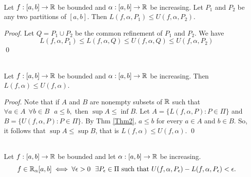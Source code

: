 \begin{theorem} \leavevmode \\
    \label{Thm2}
    Let $f: [a,b] \to \mathbb{R}$ be bounded and $\alpha : [a,b] \to \mathbb{R}$ be increasing. Let $P_1$ and $P_2$ be any two partitions of $[a,b].$ Then $L(f, \alpha, P_1) \leq U(f, \alpha, P_2)$.
\end{theorem}

\begin{proof}
    Let $Q = P_1 \cup P_2$ be the common refinement of $P_1$ and $P_2$. We have 
    $$
        L(f, \alpha, P_1) \leq L(f, \alpha, Q) \leq U(f, \alpha, Q) \leq U(f, \alpha, P_2)
    $$
    \qed
\end{proof}

\begin{theorem}  \leavevmode \\
    \label{Thm6.5}
    Let $f: [a,b] \to \mathbb{R}$ be bounded and $\alpha : [a,b] \to \mathbb{R}$ be increasing. Then $L(f, \alpha) \leq U(f, \alpha)$.
\end{theorem}

\begin{proof}
    Note that if $A$ and $B$ are nonempty subsets of $\mathbb{R}$ such that $\forall a \in A ~~\forall b \in B ~~~ a \leq b,$ then $\sup A \leq \inf B.$ Let $A= \{L(f, \alpha, P) : P \in \Pi\}$ and $B = \{U(f, \alpha, P) : P \in \Pi\}.$ By Thm \ref{Thm2}, $a \leq b$ for every $a \in A$ and $b \in B.$ So, it follows that $\sup A \leq \sup B$, that is $L(f, \alpha) \leq U(f, \alpha)$.
    \qed
\end{proof}

\begin{theorem}  \leavevmode \\
    \label{Thm6.6}
    Let $f: [a,b] \to \mathbb{R}$ be bounded and let $\alpha : [a,b] \to \mathbb{R}$ be increasing.
    $$
    f \in \mathbb{R}_\alpha [a,b] \iff \forall \epsilon > 0 ~~\exists P_\epsilon \in \Pi \text{ such that } U(f, \alpha, P_\epsilon) - L(f, \alpha, P_\epsilon) < \epsilon.
    $$
\end{theorem}

